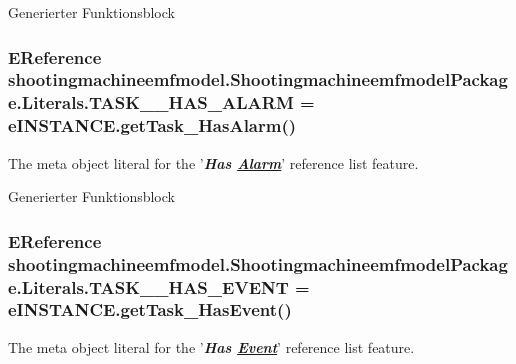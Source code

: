 Generierter Funktionsblock \hypertarget{interfaceshootingmachineemfmodel_1_1_shootingmachineemfmodel_package_1_1_literals_a765d7ba7a3095109fbd494db4df0967e}{
\subsubsection[{T\-A\-S\-K\-\_\-\-\_\-\-H\-A\-S\-\_\-\-A\-L\-A\-R\-M}]{\setlength{\rightskip}{0pt plus 5cm}E\-Reference shootingmachineemfmodel.\-Shootingmachineemfmodel\-Package.\-Literals.\-T\-A\-S\-K\-\_\-\-\_\-\-H\-A\-S\-\_\-\-A\-L\-A\-R\-M = e\-I\-N\-S\-T\-A\-N\-C\-E.\-get\-Task\-\_\-\-Has\-Alarm()}}\label{interfaceshootingmachineemfmodel_1_1_shootingmachineemfmodel_package_1_1_literals_a765d7ba7a3095109fbd494db4df0967e}
The meta object literal for the '{\itshape {\bfseries Has \hyperlink{interfaceshootingmachineemfmodel_1_1_alarm}{Alarm}}}' reference list feature.

Generierter Funktionsblock \hypertarget{interfaceshootingmachineemfmodel_1_1_shootingmachineemfmodel_package_1_1_literals_a3ce372c79cc7d3893756d575f849f232}{
\subsubsection[{T\-A\-S\-K\-\_\-\-\_\-\-H\-A\-S\-\_\-\-E\-V\-E\-N\-T}]{\setlength{\rightskip}{0pt plus 5cm}E\-Reference shootingmachineemfmodel.\-Shootingmachineemfmodel\-Package.\-Literals.\-T\-A\-S\-K\-\_\-\-\_\-\-H\-A\-S\-\_\-\-E\-V\-E\-N\-T = e\-I\-N\-S\-T\-A\-N\-C\-E.\-get\-Task\-\_\-\-Has\-Event()}}\label{interfaceshootingmachineemfmodel_1_1_shootingmachineemfmodel_package_1_1_literals_a3ce372c79cc7d3893756d575f849f232}
The meta object literal for the '{\itshape {\bfseries Has \hyperlink{interfaceshootingmachineemfmodel_1_1_event}{Event}}}' reference list feature.


